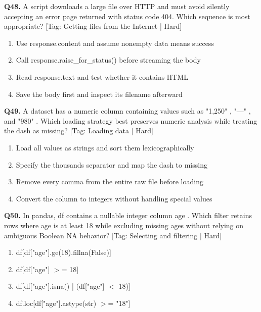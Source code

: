 \vspace{2mm}
\noindent\textbf{Q48.} A script downloads a large file over HTTP and must avoid silently accepting an error page returned with status code 404. Which sequence is most appropriate? \hfill [Tag: Getting files from the Internet | Hard]
\begin{enumerate}[label=(\alph*),topsep=2pt,itemsep=1pt,partopsep=0pt,parsep=0pt]
    \item {Use response.content and assume nonempty data means success}
    \item {Call response.raise\_for\_status() before streaming the body}
    \item {Read response.text and test whether it contains HTML}
    \item {Save the body first and inspect its filename afterward}
\end{enumerate}
\vspace{2mm}
\noindent\textbf{Q49.} A dataset has a numeric column containing values such as "1,250" , "---" , and "980" . Which loading strategy best preserves numeric analysis while treating the dash as missing? \hfill [Tag: Loading data | Hard]
\begin{enumerate}[label=(\alph*),topsep=2pt,itemsep=1pt,partopsep=0pt,parsep=0pt]
    \item {Load all values as strings and sort them lexicographically}
    \item {Specify the thousands separator and map the dash to missing}
    \item {Remove every comma from the entire raw file before loading}
    \item {Convert the column to integers without handling special values}
\end{enumerate}
\vspace{2mm}
\noindent\textbf{Q50.} In pandas, df contains a nullable integer column age . Which filter retains rows where age is at least 18 while excluding missing ages without relying on ambiguous Boolean NA behavior? \hfill [Tag: Selecting and filtering | Hard]
\begin{enumerate}[label=(\alph*),topsep=2pt,itemsep=1pt,partopsep=0pt,parsep=0pt]
    \item {df[df["age"].ge(18).fillna(False)]}
    \item {df[df["age"] $>$= 18]}
    \item {df[df["age"].isna() | (df["age"] $<$ 18)]}
    \item {df.loc[df["age"].astype(str) $>$= "18"]}
\end{enumerate}
